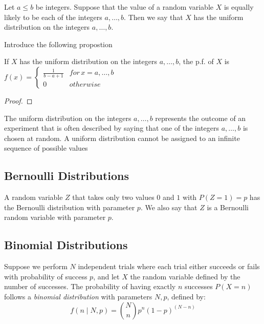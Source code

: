 \begin{definition}
Let $a \leq b$ be integers. Suppose that the value of a random variable $X$ is equally likely to be each of the integers $a, \ldots, b$. Then we say that $X$ has the uniform distribution on the integers $a, \ldots, b$.
\end{definition}

{\color{red} Introduce the following propostion}

\begin{proposition}
If $X$ has the uniform distribution on the integers $a,\ldots,b$, the p.f. of $X$ is $f\left(x\right)=\begin{cases}
\frac{1}{b-a+1} & for\,x=a,\ldots,b\\
0 & otherwise
\end{cases}$
\end{proposition}
\begin{proof}
\end{proof}

{\color{red} The uniform distribution on the integers $a, \ldots, b$ represents the outcome of an experiment that is often described by saying that one of the integers $a, \ldots, b$ is chosen at random. A uniform distribution cannot be assigned to an infinite sequence of possible values}


\subsection{Bernoulli Distributions}

\begin{example}
A random variable $Z$ that takes only two values $0$ and $1$ with $P\left(Z=1\right)=p$ has the Bernoulli distribution with parameter $p$. We also say that $Z$ is a Bernoulli random variable with parameter $p$.
\end{example}

\subsection{Binomial Distributions}

\begin{example}
Suppose we perform $N$ independent trials where each trial either succeeds or fails with probability of success $p$, and let $X$ the random variable defined by the number of successes. The probability of having exactly $n$ successes $P(X=n)$ follows a \emph{binomial distribution} with parameters $N, p$, defined by:
\[
f(n\mid N, p) = \binom{N}{n} p^n (1-p)^{(N-n)}
\]
\end{example}

